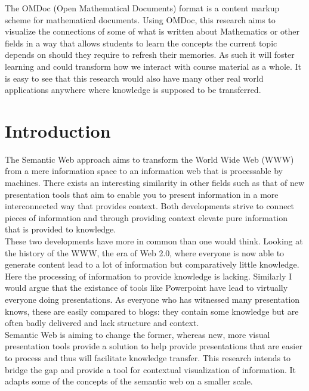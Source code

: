 \documentclass[twoside]{article}
\begin{document}
The OMDoc (Open Mathematical Documents) format is a content markup scheme for mathematical documents.\cite{OMDoc book} Using OMDoc, this research aims to visualize the connections of some of what is written about Mathematics or other fields in a way that allows students to learn the concepts the current topic depends on should they require to refresh their memories. As such it will foster learning and could transform how we interact with course material as a whole. It is easy to see that this research would also have many other real world applications anywhere where knowledge is supposed to be transferred.\\ 

  \newpage
  \tableofcontents

  \clearpage

  \section{Introduction}

The Semantic Web approach aims to transform the World Wide Web (WWW) from a mere information space to an information web that is processable by machines.\cite{SemWeb} There exists an interesting similarity in other fields such as that of new presentation tools that aim to enable you to present information in a more interconnected way that provides context. Both developments strive to connect pieces of information and through providing context elevate pure information that is provided to knowledge.\\

These two developments have more in common than one would think. Looking at the history of the WWW, the era of Web 2.0, where everyone is now able to generate content lead to a lot of information but comparatively little knowledge.\cite{Weller} Here the processing of information to provide knowledge is lacking. Similarly I would argue that the existance of tools like Powerpoint have lead to virtually everyone doing presentations. As everyone who has witnessed many presentation knows, these are easily compared to blogs: they contain some knowledge but are often badly delivered and lack structure and context.\\

Semantic Web is aiming to change the former, whereas new, more visual presentation tools provide a solution to help provide presentations that are easier to process and thus will facilitate knowledge transfer. This research intends to bridge the gap and provide a tool for contextual visualization of information. It adapts some of the concepts of the semantic web on a smaller scale.
\end{document}
